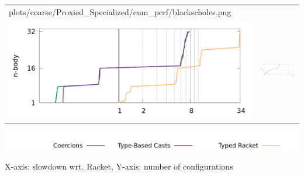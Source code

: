 \documentclass[12pt]{beamer}
\begin{document}
{\begin{tabular}{lr}
      {plots/coarse/Proxied_Specialized/cum_perf/blackscholes.png}
     \\[-1ex]
      \includegraphics[scale = 0.15]
      {plots/coarse/Proxied_Specialized/cum_perf/n_body.png}
     &
      \includegraphics[scale = 0.15]
      {plots/coarse/Proxied_Specialized/cum_perf/fft.png}
  \end{tabular}
  \vspace{-10pt}
  \begin{center}
    \includegraphics[scale = 0.25]{plots/coarse/Proxied_Specialized/cum_perf/legend.png}
  \end{center}
  \vspace{-10pt}
  {\small X-axis: slowdown wrt. Racket, Y-axis: number of configurations}

}
\end{document}
